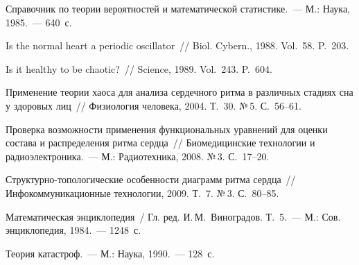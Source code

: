 \begin{multicols}{2}
{{\begin{thebibliography}{99}
Справочник по теории вероятностей и математической статистике.~--- М.: 
Наука, 1985.~--- 640~с.

Is the normal heart a periodic oscillator~// Biol. Cybern., 1988. Vol.~58. P.~203.

Is it healthy to be chaotic?~// Science, 1989. Vol.~243. P.~604.


Применение теории хаоса для анализа сердечного ритма в различных стадиях 
сна у здоровых лиц~// Физиология человека, 2004. Т.~30. №\,5. С.~56--61.

Проверка возможности применения функциональных уравнений для оценки 
состава и распределения ритма сердца~// Биомедицинские технологии и 
радиоэлектроника.~--- М.: Радиотехника, 2008. №\,3. С.~17--20.

Структурно-топологические особенности диаграмм ритма сердца~// 
Инфокоммуникационные технологии, 2009. Т.~7. №\,3. С.~80--85. 

Математическая энциклопедия~/ Гл. ред. И.\,М.~Виноградов. Т.~5.~--- М.: Сов. 
энциклопедия, 1984.~--- 1248~с.

 \label{end\stat}

Теория катастроф.~--- М.: Наука, 1990.~--- 128~с.
 \end{thebibliography}
}
}


\end{multicols}